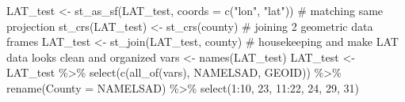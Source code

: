 \documentclass[
  letterpaper,
  DIV=11,
  numbers=noendperiod]{scrartcl}
\newenvironment{Shaded}{\begin{snugshade}}{\end{snugshade}}
\newcommand{\AttributeTok}[1]{\textcolor[rgb]{0.40,0.45,0.13}{#1}}
\newcommand{\CommentTok}[1]{\textcolor[rgb]{0.37,0.37,0.37}{#1}}
\newcommand{\DecValTok}[1]{\textcolor[rgb]{0.68,0.00,0.00}{#1}}
\newcommand{\FunctionTok}[1]{\textcolor[rgb]{0.28,0.35,0.67}{#1}}
\newcommand{\NormalTok}[1]{\textcolor[rgb]{0.00,0.23,0.31}{#1}}
\newcommand{\OtherTok}[1]{\textcolor[rgb]{0.00,0.23,0.31}{#1}}
\newcommand{\SpecialCharTok}[1]{\textcolor[rgb]{0.37,0.37,0.37}{#1}}
\newcommand{\StringTok}[1]{\textcolor[rgb]{0.13,0.47,0.30}{#1}}
\begin{document}
\begin{Shaded}
\begin{Highlighting}[]
\NormalTok{LAT\_test }\OtherTok{\textless{}{-}} \FunctionTok{st\_as\_sf}\NormalTok{(LAT\_test, }\AttributeTok{coords =} \FunctionTok{c}\NormalTok{(}\StringTok{"lon"}\NormalTok{, }\StringTok{"lat"}\NormalTok{))}
\CommentTok{\# matching same projection}
\FunctionTok{st\_crs}\NormalTok{(LAT\_test) }\OtherTok{\textless{}{-}} \FunctionTok{st\_crs}\NormalTok{(county)}
\CommentTok{\# joining 2 geometric data frames}
\NormalTok{LAT\_test }\OtherTok{\textless{}{-}} \FunctionTok{st\_join}\NormalTok{(LAT\_test, county)}
\CommentTok{\# housekeeping and make LAT data looks clean and organized}
\NormalTok{vars }\OtherTok{\textless{}{-}} \FunctionTok{names}\NormalTok{(LAT\_test)}
\NormalTok{LAT\_test }\OtherTok{\textless{}{-}}\NormalTok{ LAT\_test }\SpecialCharTok{\%\textgreater{}\%}
  \FunctionTok{select}\NormalTok{(}\FunctionTok{c}\NormalTok{(}\FunctionTok{all\_of}\NormalTok{(vars), NAMELSAD, GEOID)) }\SpecialCharTok{\%\textgreater{}\%}
  \FunctionTok{rename}\NormalTok{(}\AttributeTok{County =}\NormalTok{ NAMELSAD) }\SpecialCharTok{\%\textgreater{}\%}
  \FunctionTok{select}\NormalTok{(}\DecValTok{1}\SpecialCharTok{:}\DecValTok{10}\NormalTok{, }\DecValTok{23}\NormalTok{, }\DecValTok{11}\SpecialCharTok{:}\DecValTok{22}\NormalTok{, }\DecValTok{24}\NormalTok{, }\DecValTok{29}\NormalTok{, }\DecValTok{31}\NormalTok{)}
\end{Highlighting}
\end{Shaded}
\end{document}
